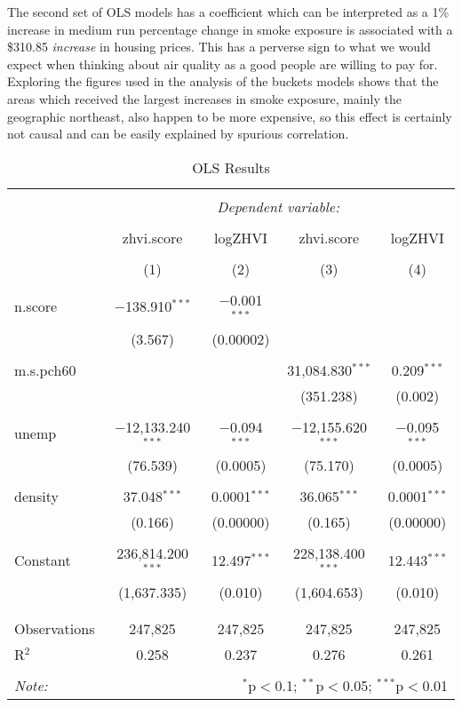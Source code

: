 \documentclass[12pt]{article}
\begin{document}
The second set of OLS models has a coefficient which can be interpreted as a 1\% increase in medium run percentage change in smoke exposure is associated with a \$310.85 \textit{increase} in housing prices.  This has a perverse sign to what we would expect when thinking about air quality as a good people are willing to pay for.  Exploring the figures used in the analysis of the buckets models shows that the areas which received the largest increases in smoke exposure, mainly the geographic northeast, also happen to be more expensive, so this effect is certainly not causal and can be easily explained by spurious correlation.  

\begin{table}[!htbp] \centering 
  \caption{OLS Results} 
  \label{} 
\begin{tabular}{@{\extracolsep{5pt}}lcccc} 
\\[-1.8ex]\hline 
\hline \\[-1.8ex] 
 & \multicolumn{4}{c}{\textit{Dependent variable:}} \\ 
\cline{2-5} 
\\[-1.8ex] & zhvi.score & logZHVI & zhvi.score & logZHVI \\ 
\\[-1.8ex] & (1) & (2) & (3) & (4)\\ 
\hline \\[-1.8ex] 
 n.score & $-$138.910$^{***}$ & $-$0.001$^{***}$ &  &  \\ 
  & (3.567) & (0.00002) &  &  \\ 
  & & & & \\ 
 m.s.pch60 &  &  & 31,084.830$^{***}$ & 0.209$^{***}$ \\ 
  &  &  & (351.238) & (0.002) \\ 
  & & & & \\ 
 unemp & $-$12,133.240$^{***}$ & $-$0.094$^{***}$ & $-$12,155.620$^{***}$ & $-$0.095$^{***}$ \\ 
  & (76.539) & (0.0005) & (75.170) & (0.0005) \\ 
  & & & & \\ 
 density & 37.048$^{***}$ & 0.0001$^{***}$ & 36.065$^{***}$ & 0.0001$^{***}$ \\ 
  & (0.166) & (0.00000) & (0.165) & (0.00000) \\ 
  & & & & \\ 
 Constant & 236,814.200$^{***}$ & 12.497$^{***}$ & 228,138.400$^{***}$ & 12.443$^{***}$ \\ 
  & (1,637.335) & (0.010) & (1,604.653) & (0.010) \\ 
  & & & & \\ 
\hline \\[-1.8ex] 
Observations & 247,825 & 247,825 & 247,825 & 247,825 \\ 
R$^{2}$ & 0.258 & 0.237 & 0.276 & 0.261 \\ 
\hline 
\hline \\[-1.8ex] 
\textit{Note:}  & \multicolumn{4}{r}{$^{*}$p$<$0.1; $^{**}$p$<$0.05; $^{***}$p$<$0.01} \\ 
\end{tabular} 
\end{table} 
\end{document}
